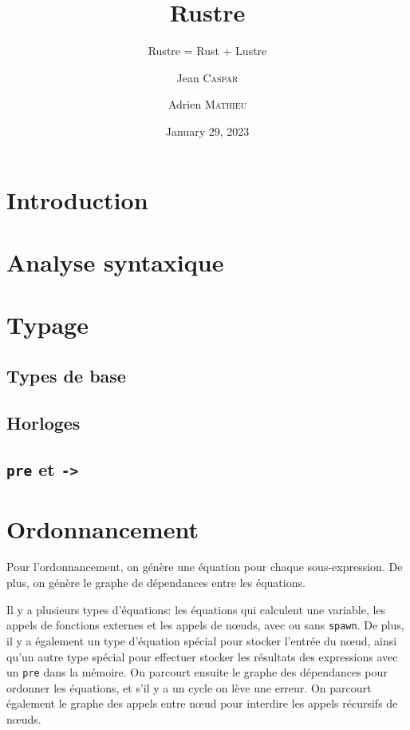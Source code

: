 \documentclass{scrartcl}
\title{Rustre}
\subtitle{Rustre = Rust + Lustre}
\author{Jean \textsc{Caspar} \and Adrien \textsc{Mathieu}}
\date{January 29, 2023}
\begin{document}
\maketitle{}
\tableofcontents

\section*{Introduction}

\section{Analyse syntaxique}

\section{Typage}
\subsection{Types de base}
\subsubsection{}

\subsection{Horloges}

\subsection{\texttt{pre} et \texttt{->}}

\section{Ordonnancement}
Pour l'ordonnancement, on génère une équation pour chaque sous-expression.
De plus, on génère le graphe de dépendances entre les équations.

Il y a plusieurs types d'équations: les équations qui calculent une variable, les appels
de fonctions externes et les appels de n\oe{}uds, avec ou sans \texttt{spawn}. De plus,
il y a également un type d'équation spécial pour stocker l'entrée du n\oe{}ud, ainsi qu'un
autre type spécial pour effectuer stocker les résultats des expressions avec un \texttt{pre}
dans la mémoire. On parcourt ensuite le graphe des dépendances pour ordonner les équations, et s'il y
a un cycle on lève une erreur. On parcourt également le graphe des appels entre n\oe{}ud pour interdire les
appels récursifs de n\oe{}uds.
\end{document}
